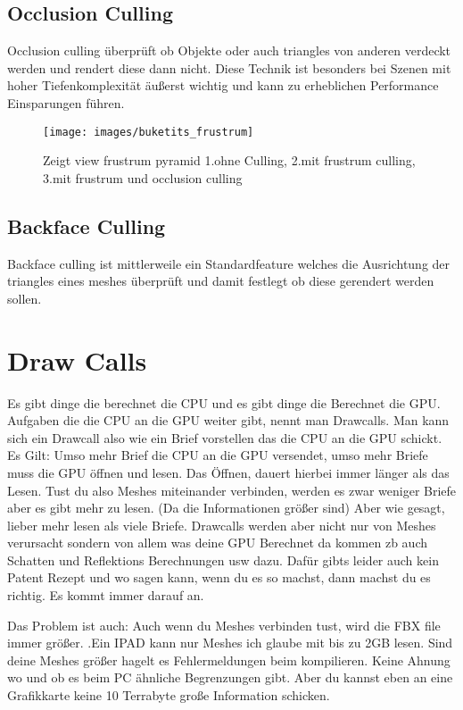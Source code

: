 \subsection{Occlusion Culling}
Occlusion culling überprüft ob Objekte oder auch triangles von anderen verdeckt werden und rendert diese dann nicht. Diese Technik ist besonders bei Szenen mit hoher Tiefenkomplexität äußerst wichtig und kann zu erheblichen Performance Einsparungen führen.
\cite{_cryengine_culling}

\begin{figure}[h]
	\centering
	\texttt{[image: images/buketits\_frustrum]}
	\caption{Zeigt view frustrum pyramid 1.ohne Culling, 2.mit frustrum culling, 3.mit frustrum und occlusion culling\cite{_culling}}
\end{figure}

\subsection{Backface Culling}
Backface culling ist mittlerweile ein Standardfeature welches die Ausrichtung der triangles eines meshes überprüft und damit festlegt ob diese gerendert werden sollen.
\cite{_cryengine_culling}

\section{Draw Calls}
Es gibt dinge die berechnet die CPU und es gibt dinge die Berechnet die GPU.
Aufgaben die die CPU an die GPU weiter gibt, nennt man Drawcalls.
Man kann sich ein Drawcall also wie ein Brief vorstellen das die CPU an die GPU schickt.
Es Gilt: Umso mehr Brief die CPU an die GPU versendet, umso mehr Briefe muss die GPU öffnen und lesen.
Das Öffnen, dauert hierbei immer länger als das Lesen.
Tust du also Meshes miteinander verbinden, werden es zwar weniger Briefe aber es gibt mehr zu lesen. (Da die Informationen größer sind)
Aber wie gesagt, lieber mehr lesen als viele Briefe.
Drawcalls werden aber nicht nur von Meshes verursacht sondern von allem was deine GPU Berechnet da kommen zb auch Schatten und Reflektions Berechnungen usw dazu.
Dafür gibts leider auch kein Patent Rezept und wo sagen kann, wenn du es so machst, dann machst du es richtig. Es kommt immer darauf an.

Das Problem ist auch:
Auch wenn du Meshes verbinden tust, wird die FBX file immer größer. .Ein IPAD kann nur Meshes ich glaube mit bis zu 2GB lesen. Sind deine Meshes größer hagelt es Fehlermeldungen beim kompilieren. Keine Ahnung wo und ob es beim PC ähnliche Begrenzungen gibt.
Aber du kannst eben an eine Grafikkarte keine 10 Terrabyte große Information schicken.

